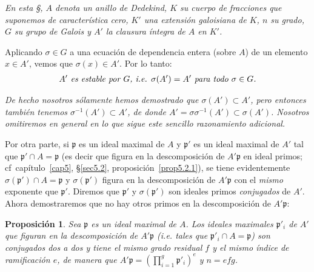 \documentclass[oneside,bibtotoc,leqno,spanish]{amsbook}
\newcommand{\idl}[1]{\mathfrak{#1}}
\numberwithin{equation}{section}
\newenvironment{comm}%
	{\begin{trivlist}\item\small\itshape}
	{\end{trivlist}}
\theoremstyle{defi}
\theoremstyle{note}
\newtheorem{proposition}{Proposici\'on}
\theoremstyle{rem}
\numberwithin{theorem}{section}
\numberwithin{proposition}{section}
\numberwithin{definition}{section}
\numberwithin{lemma}{section}
\numberwithin{corollary}{section}
\numberwithin{example}{section}
\numberwithin{footnote}{section}%
\begin{document}
\begin{trivlist}
\item \textit{En esta \S, $A$ denota un anillo de Dedekind, $K$ su cuerpo de fracciones que suponemos
de caracter\'istica cero, $K'$ una extensi\'on galoisiana de $K$, $n$ su grado, $G$ su grupo de Galois y
$A'$ la clausura \'integra de $A$ en $K'$.}
\end{trivlist}

Aplicando $\sigma\in G$ a una ecuaci\'on de dependencia entera (sobre $A$) de un elemento $x\in A'$, vemos
que $\sigma(x)\in A'$. Por lo tanto:
\begin{gather}\label{eq6.2.1}
\text{\itshape $A'$ es estable por $G$, i.e. $\sigma(A')=A'$ para todo $\sigma\in G$.}
\end{gather}

\begin{comm}
De hecho nosotros s\'olamente hemos demostrado que $\sigma(A')\subset A'$, pero entonces tambi\'en
tenemos $\sigma^{-1}(A')\subset A'$, de donde $A'=\sigma\sigma^{-1}(A')\subset\sigma(A')$. Nosotros
omitiremos en general en lo que sigue este sencillo razonamiento adicional.
\end{comm}

Por otra parte, si $\idl{p}$ es un ideal maximal de $A$ y $\idl{p}'$ es un ideal maximal de $A'$ tal que
$\idl{p}'\cap A=\idl{p}$ (es decir que figura en la descomposici\'on de $A'\idl{p}$ en ideal primos;
cf~cap\'itulo~\ref{cap5}, \S\ref{sec5.2}, proposici\'on~\ref{prop5.2.1}),
se tiene evidentemente $\sigma(\idl{p}')\cap A=\idl{p}$ y
$\sigma(\idl{p}')$ figura en la descomposici\'on de $A'\idl{p}$ con el {\em mismo} exponente que $\idl{p}'$.
Diremos que $\idl{p}'$ y $\sigma(\idl{p}')$ son ideales primos {\em conjugados} de $A'$. Ahora demostraremos
que no hay otros primos en la descomposici\'on de $A'\idl{p}$:

\begin{proposition}\label{prop6.2.1}
Sea $\idl{p}$ es un ideal maximal de $A$. Los ideales maximales $\idl{p}'_{i}$ de $A'$ que figuran en
la descomposici\'on de $A'\idl{p}$ (i.e. tales que $\idl{p}'_{i}\cap A=\idl{p}$) son conjugados dos a dos
y tiene el mismo grado residual $f$ y el mismo \'indice de ramificaci\'on $e$, de manera que
$A'\idl{p} = \left(\prod_{i=1}^{g}\idl{p}'_{i}\right)^{e}$ y $n=efg$.
\end{proposition}
\end{document}

